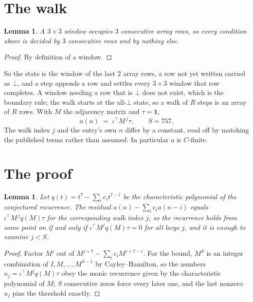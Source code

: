 \documentclass[11pt,a4paper]{article}
\theoremstyle{plain}
\newtheorem{lemma}[theorem]{Lemma}
\theoremstyle{definition}
\begin{document}
\section{The walk}

\begin{lemma}\label{lem:win}
A $3\times3$ window occupies $3$ consecutive array rows, so every condition above is
decided by $3$ consecutive rows and by nothing else.
\end{lemma}

\begin{proof}
By definition of a window.
\end{proof}

So the state is the window of the last $2$ array rows, a row not yet written carried as
$\bot$, and a step appends a row and settles every $3\times3$ window that row completes. A
window needing a row that is $\bot$ does not exist, which is the boundary rule; the walk starts
at the all-$\bot$ state, so a walk of $R$ steps is an array of $R$ rows. With $M$ the adjacency
matrix and $\tau=\mathbf{1}$,
\[
a(n)\;=\;\iota^{\!\top}M^{\,j}\tau ,\qquad S=757.
\]
The walk index $j$ and the entry's own $n$ differ by a constant, read off by matching the
published terms rather than assumed. In particular $a$ is $C$-finite.

\section{The proof}

\begin{lemma}\label{lem:crit}
Let $q(t)=t^{7}-\sum_i c_it^{7-i}$ be the characteristic polynomial of the
conjectured recurrence. The residual $a(n)-\sum_ic_ia(n-i)$ equals
$\iota^{\!\top}M^{\,j}q(M)\tau$ for the corresponding walk index $j$, so the recurrence
holds from some point on if and only if $\iota^{\!\top}M^{j}q(M)\tau=0$ for all large $j$,
and it is enough to examine $j<S$.
\end{lemma}

\begin{proof}
Factor $M^{j}$ out of $M^{j+7}-\sum_ic_iM^{j+7-i}$. For the bound, $M^{S}$
is an integer combination of $I,M,\dots,M^{S-1}$ by Cayley--Hamilton, so the numbers
$u_j=\iota^{\!\top}M^{j}q(M)\tau$ obey the monic recurrence given by the characteristic
polynomial of $M$; $S$ consecutive zeros force every later one, and the last nonzero $u_j$
pins the threshold exactly.
\end{proof}
\end{document}
